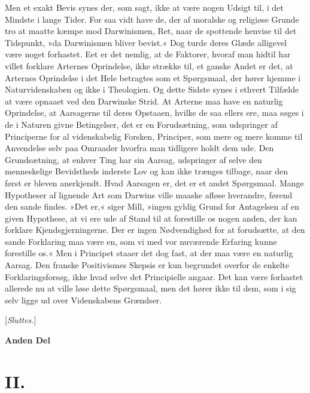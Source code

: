 \documentclass[12pt,a4paper]{article}
\begin{document}
Men et exakt Bevis synes der, som sagt, ikke at være nogen Udsigt til, i
det Mindste i lange Tider. For saa vidt have de, der af moralske og
religiøse Grunde tro at maatte kæmpe mod Darwinismen, Ret, naar de
spottende henvise til det Tidspunkt, »da Darwinismen bliver bevist.« Dog
turde deres Glæde alligevel være noget forhastet. Eet er det nemlig, at
de Faktorer, hvoraf man hidtil har villet forklare Arternes Oprindelse,
ikke strække til, et ganske Andet er det, at Arternes Oprindelse i det
Hele betragtes som et Spørgsmaal, der hører hjemme i Naturvidenskaben og
ikke i Theologien. Og dette Sidste synes i ethvert Tilfælde at være
opnaaet ved den Darwinske Strid. At Arterne maa have en naturlig
Oprindelse, at Aarsagerne til deres Opstaaen, hvilke de saa ellers ere,
maa søges i de i Naturen givne Betingelser, det er en Forudsætning, som
udspringer af Principerne for al videnskabelig Forsken, Principer, som
mere og mere komme til Anvendelse selv paa Omraader hvorfra man tidligere
holdt dem ude. Den Grundsætning, at enhver Ting har sin Aarsag,
udspringer af selve den menneskelige Bevidstheds inderste Lov og kan ikke
trænges tilbage, naar den først er bleven anerkjendt. Hvad Aarsagen er,
det er et andet Spørgsmaal. Mange Hypotheser af lignende Art som Darwins
ville maaske afløse hverandre, førend den sande findes. »Det er,« siger
Mill, »ingen gyldig Grund for Antagelsen af en given Hypothese, at vi
ere ude af Stand til at forestille os nogen anden, der kan forklare
Kjendsgjerningerne. Der er ingen Nødvendighed for at forudsætte, at den
sande Forklaring maa være en, som vi med vor nuværende Erfaring kunne
forestille os.« Men i Principet staaer det dog fast, at der maa være en
naturlig Aarsag. Den franske Positivismes Skepsis er kun begrundet
overfor de enkelte Forklaringsforsøg, ikke hvad selve det Principielle
angaar. Det kan være forhastet allerede nu at ville løse dette Spørgsmaal,
men det hører ikke til dem, som i sig selv ligge ud over Videnskabens
Grændser.

\medskip
\begin{center}
[\emph{Sluttes.}]
\end{center}


\bigskip
\begin{center}
\textbf{Anden Del}
\end{center}
\medskip

\section*{II.}
\end{document}
